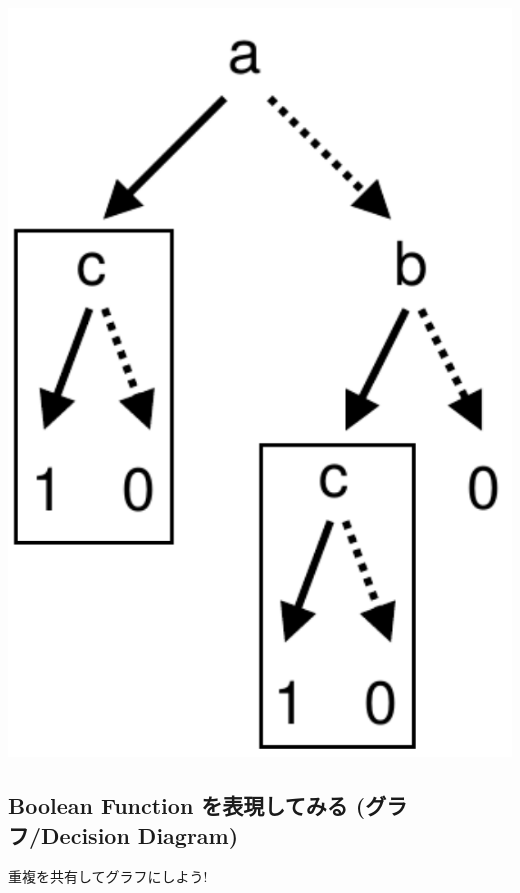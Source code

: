 \begin{container-fluid}
\begin{row-fluid}
\begin{span4}
\includegraphics{img/dd-tree2.png}
\end{span4}
\end{row-fluid}
\end{container-fluid}

\subsection{Boolean Function を表現してみる (グラフ/Decision Diagram)}
\label{sec-4-5}

重複を共有してグラフにしよう!

